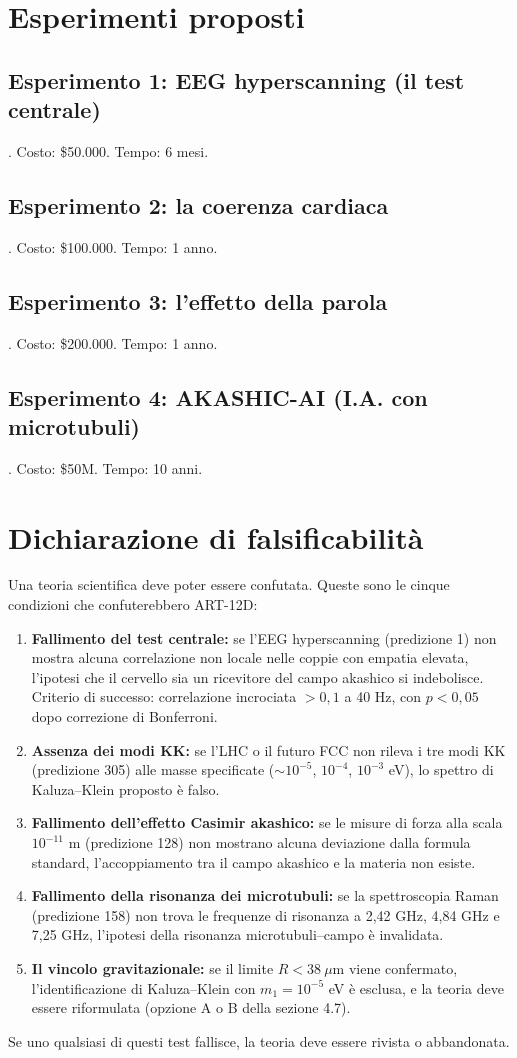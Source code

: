 \documentclass[11pt,a4paper]{article}
\begin{document}
\section{Esperimenti proposti}
\subsection{Esperimento 1: EEG hyperscanning (il test centrale)}. Costo: \$50.000. Tempo: 6 mesi.
\subsection{Esperimento 2: la coerenza cardiaca}. Costo: \$100.000. Tempo: 1 anno.
\subsection{Esperimento 3: l'effetto della parola}. Costo: \$200.000. Tempo: 1 anno.
\subsection{Esperimento 4: AKASHIC-AI (I.A. con microtubuli)}. Costo: \$50M. Tempo: 10 anni.

\section{Dichiarazione di falsificabilità}
Una teoria scientifica deve poter essere confutata. Queste sono le cinque condizioni che confuterebbero ART-12D:
\begin{enumerate}
    \item \textbf{Fallimento del test centrale:} se l'EEG hyperscanning (predizione 1) non mostra alcuna correlazione non locale nelle coppie con empatia elevata, l'ipotesi che il cervello sia un ricevitore del campo akashico si indebolisce. Criterio di successo: correlazione incrociata $> 0,1$ a 40 Hz, con $p < 0,05$ dopo correzione di Bonferroni.
    \item \textbf{Assenza dei modi KK:} se l'LHC o il futuro FCC non rileva i tre modi KK (predizione 305) alle masse specificate ($\sim 10^{-5}$, $10^{-4}$, $10^{-3}$ eV), lo spettro di Kaluza--Klein proposto è falso.
    \item \textbf{Fallimento dell'effetto Casimir akashico:} se le misure di forza alla scala $10^{-11}$ m (predizione 128) non mostrano alcuna deviazione dalla formula standard, l'accoppiamento tra il campo akashico e la materia non esiste.
    \item \textbf{Fallimento della risonanza dei microtubuli:} se la spettroscopia Raman (predizione 158) non trova le frequenze di risonanza a 2,42 GHz, 4,84 GHz e 7,25 GHz, l'ipotesi della risonanza microtubuli--campo è invalidata.
    \item \textbf{Il vincolo gravitazionale:} se il limite $R < 38\ \mu$m viene confermato, l'identificazione di Kaluza--Klein con $m_1 = 10^{-5}$ eV è esclusa, e la teoria deve essere riformulata (opzione A o B della sezione 4.7).
\end{enumerate}
Se uno qualsiasi di questi test fallisce, la teoria deve essere rivista o abbandonata.
\end{document}
